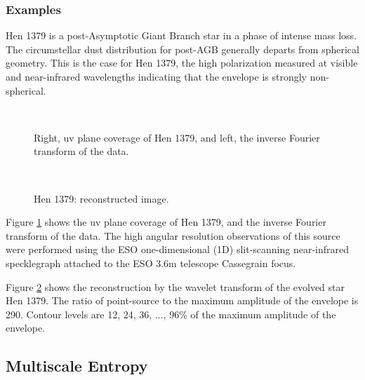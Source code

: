 \documentclass[11pt,a4paper]{article}
\begin{document}
\subsubsection{Examples}
 Hen 1379 is a post-Asymptotic Giant Branch star in a phase
of intense mass loss. The circumstellar dust
distribution for post-AGB generally departs from  spherical geometry. 
This is the case for Hen 1379, the high polarization measured at
visible and near-infrared wavelengths indicating that the envelope is 
strongly non-spherical.

\begin{figure}[htb]
\centerline{
\hbox{
}}
\caption{Right, uv plane coverage of Hen 1379, and left, the inverse Fourier transform of the data.}
\label{fig_rec_hen1}
\end{figure}

\begin{figure}[h]
\centerline{
\hbox{
}}
\caption{Hen 1379: reconstructed image.}
\label{fig_rec_hen2}
\end{figure}
 
Figure \ref{fig_rec_hen1} shows the uv plane coverage of Hen 1379,
and the inverse Fourier transform of the data.
The high angular resolution observations of this source were performed  
using the ESO one-dimensional (1D) slit-scanning near-infrared specklegraph 
attached to the ESO 3.6m telescope Cassegrain focus. 

Figure \ref{fig_rec_hen2} shows the reconstruction by the wavelet transform
of the evolved star Hen 1379. The ratio of 
point-source to the maximum amplitude of the envelope is 290. Contour
levels are 12, 24, 36, $\dots$, 96\% of the maximum amplitude of the envelope.


\subsection{Multiscale Entropy}
\end{document}
